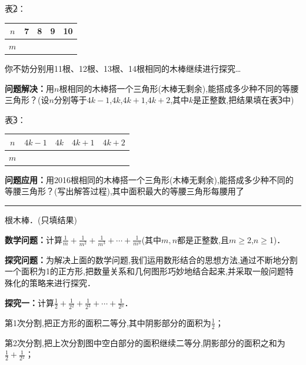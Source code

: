 \documentclass[10pt,a4paper]{ctexart}
\newcommand{\nianfen}[1]{\hspace{-2em}{(#1\textbf{·}\textit{青岛}\textbf{·}23)}}
\newcommand{\kong}{\rule{4em}{0.5pt}}
\begin{document}
	表\textcircled{2}：
	
	\begin{center}
		\begin{tabular}{|c|c|c|c|c|}
		\hline 
		$n$ & 7 & 8 & 9 & 10\\ 
		\hline 
		$m$ &  &  &  &  \\ 
		\hline 
	\end{tabular} 
	\end{center}
	
	你不妨分别用11根、12根、13根、14根相同的木棒继续进行探究…
	
	\textbf{问题解决：}用$ n $根相同的木棒搭一个三角形(木棒无剩余),能搭成多少种不同的等腰三角形？(设$ n $分别等于$ 4k-1 $,$ 4k $,$ 4k+1 $,$ 4k+2 $,其中$ k $是正整数,把结果填在表\textcircled{3}中) 
	
	表\textcircled{3}：
	
	\begin{center}
		\begin{tabular}{|c|c|c|c|c|}
		\hline 
		$n$ & $4k-1$ & $4k$ & $4k+1$ & $4k+2$\\ 
		\hline 
		$m$ &  &  &  &  \\ 
		\hline 
	\end{tabular}
	\end{center} 

	\textbf{问题应用：}用2016根相同的木棒搭一个三角形(木棒无剩余),能搭成多少种不同的等腰三角形？(写出解答过程),其中面积最大的等腰三角形每腰用了\kong 根木棒．(只填结果)
	
	\mbox{}
	
	\nianfen{2014}
	
	\textbf{数学问题：}计算${{\frac{{{1}}}{{{m}}}}{+}{\frac{{{1}}}{{{m}{^{{2}}}}}}{+}{\frac{{{1}}}{{{m}{^{{3}}}}}}{+}{\cdots 
		}{+}{\frac{{{1}}}{{{m}{^{{n}}}}}}}$(其中$m,n$都是正整数,且$m\ge 
	$2,$n\ge $1)．
	
	\textbf{探究问题：}为解决上面的数学问题,我们运用数形结合的思想方法,通过不断地分割一个面积为1的正方形,把数量关系和几何图形巧妙地结合起来,并采取一般问题特殊化的策略来进行探究．
	
	\textbf{探究一：}计算${{\frac{{{1}}}{{{2}}}}{+}{\frac{{{1}}}{{{2}{^{{2}}}}}}{+}{\frac{{{1}}}{{{2}{^{{3}}}}}}{+}{\cdots 
		}{+}{\frac{{{1}}}{{{2}{^{{n}}}}}}}$．
	
	第1次分割,把正方形的面积二等分,其中阴影部分的面积为${{\frac{{{1}}}{{{2}}}}}$；
	
	第2次分割,把上次分割图中空白部分的面积继续二等分,阴影部分的面积之和为${{\frac{{{1}}}{{{2}}}}{+}{\frac{{{1}}}{{{2}{^{{2}}}}}}}$；
	
\end{document}
